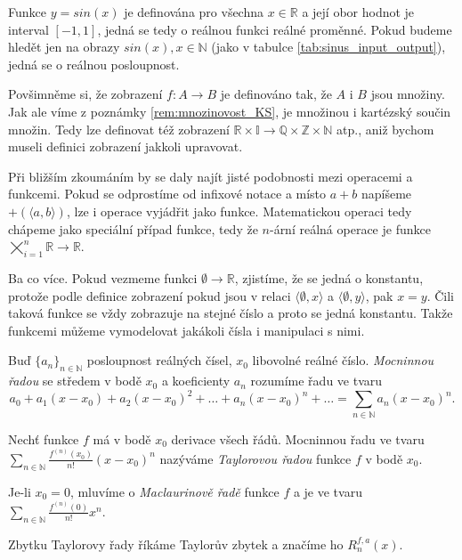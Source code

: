 \begin{example}
Funkce $y=sin(x)$ je definována pro všechna $x\in\mathbb{R}$ a její obor hodnot je interval $[-1,1]$, jedná se tedy o reálnou funkci reálné proměnné. Pokud budeme hledět jen na obrazy $sin(x), x\in\mathbb{N}$ (jako v tabulce \ref{tab:sinus_input_output}), jedná se o reálnou posloupnost.
\end{example}

Povšimněme si, že zobrazení $f:A\rightarrow B$ je definováno tak, že $A$ i $B$ jsou množiny. Jak ale víme z poznámky \ref{rem:mnozinovost_KS}, je množinou i kartézský součin množin. Tedy lze definovat též zobrazení $\mathbb{R}\times\mathbb{I}\rightarrow\mathbb{Q}\times\mathbb{Z}\times\mathbb{N}$ atp., aniž bychom museli definici zobrazení jakkoli upravovat.

Při bližším zkoumáním by se daly najít jisté podobnosti mezi operacemi a funkcemi. Pokud se odprostíme od infixové notace a místo $a + b$ napíšeme $+(\langle a, b\rangle)$, lze i operace vyjádřit jako funkce. Matematickou operaci tedy chápeme jako speciální případ funkce, tedy že $n$-ární reálná operace je funkce $\bigtimes_{i=1}^{n}\mathbb{R}\rightarrow \mathbb{R}$.

Ba co více. Pokud vezmeme funkci $\emptyset \rightarrow \mathbb{R}$, zjistíme, že se jedná o konstantu, protože podle definice zobrazení pokud jsou v relaci $\langle \emptyset, x\rangle$ a $\langle \emptyset, y\rangle$, pak $x = y$. Čili taková funkce se vždy zobrazuje na stejné číslo a proto se jedná konstantu. Takže funkcemi můžeme vymodelovat jakákoli čísla i manipulaci s nimi.

\begin{definition}
Buď $\{a_n\}_{n\in\mathbb{N}}$ posloupnost reálných čísel, $x_0$ libovolné reálné číslo. \textit{Mocninnou řadou} se středem v bodě $x_0$ a koeficienty $a_n$ rozumíme řadu ve tvaru
\begin{equation}
a_0+a_1(x-x_0)+a_2(x-x_0)^2+\ldots+a_n(x-x_0)^n+\ldots=\sum_{n\in\mathbb{N}}a_n(x-x_0)^n.
\end{equation}
\end{definition}

\begin{definition}\label{def:taymac_rada}
Nechť funkce $f$ má v bodě $x_0$ derivace všech řádů. Mocninnou řadu ve tvaru $\sum_{n\in\mathbb{N}}\frac{f^{(n)}(x_0)}{n!}(x-x_0)^n$ nazýváme \textit{Taylorovou řadou} funkce $f$ v bodě $x_0$.

Je-li $x_0=0$, mluvíme o \textit{Maclaurinově řadě} funkce $f$ a je ve tvaru $\sum_{n\in\mathbb{N}}\frac{f^{(n)}(0)}{n!}x^n$.

Zbytku Taylorovy řady říkáme Taylorův zbytek a značíme ho $R^{f,a}_n(x)$.
\end{definition}

